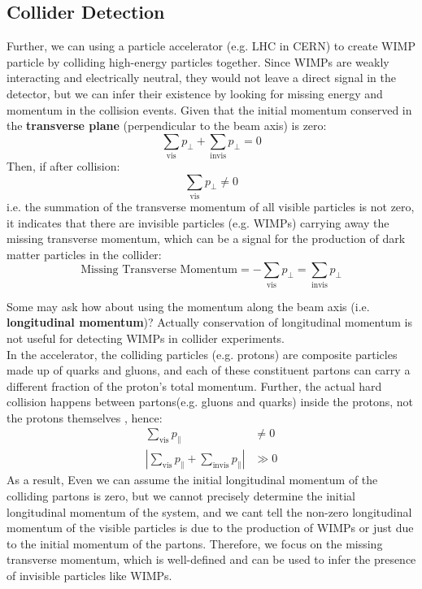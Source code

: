 \subsection{Collider Detection}
\begin{intuition}
    Further, we can using a particle accelerator (e.g. LHC in CERN) to create WIMP particle by colliding high-energy particles together. Since WIMPs are weakly interacting and electrically neutral, they would not leave a direct signal in the detector, but we can infer their existence by looking for missing energy and momentum in the collision events. Given that the initial momentum conserved in the \textbf{transverse plane} (perpendicular to the beam axis) is zero:
    \[
        \sum_{\text{vis}} p_{\perp} + \sum_{\text{invis}} p_{\perp} = 0
    \]
    Then, if after collision:
    \[
        \sum_{\text{vis}} p_{\perp} \neq 0
    \]
    i.e. the summation of the transverse momentum of all visible particles is not zero, it indicates that there are invisible particles (e.g. WIMPs) carrying away the missing transverse momentum, which can be a signal for the production of dark matter particles in the collider:
    \[
        \text{Missing Transverse Momentum} = - \sum_{\text{vis}} p_{\perp} = \sum_{\text{invis}} p_{\perp}
    \]
\end{intuition}

\bigskip \noindent
\begin{intuition}
    Some may ask how about using the momentum along the beam axis (i.e. \textbf{longitudinal momentum})? Actually conservation of longitudinal momentum is not useful for detecting WIMPs in collider experiments. \\
    
    In the accelerator, the colliding particles (e.g. protons) are composite particles made up of quarks and gluons, and each of these constituent partons can carry a different fraction of the proton's total momentum. Further, the actual hard collision happens between partons(e.g. gluons and quarks) inside the protons, not the protons themselves \cite{PhysicsGurus_Energies_Accelerator_Collision}, hence:
    \begin{align*}
        \sum_{\text{vis}} p_{\parallel} &\neq 0 \\
        | \sum_{\text{vis}} p_{\parallel} + \sum_{\text{invis}} p_{\parallel} | & \gg 0
    \end{align*}
    As a result, Even we can assume the initial longitudinal momentum of the colliding partons is zero, but we cannot precisely determine the initial longitudinal momentum of the system, and we cant tell the non-zero longitudinal momentum of the visible particles is due to the production of WIMPs or just due to the initial momentum of the partons. Therefore, we focus on the missing transverse momentum, which is well-defined and can be used to infer the presence of invisible particles like WIMPs.
\end{intuition}

